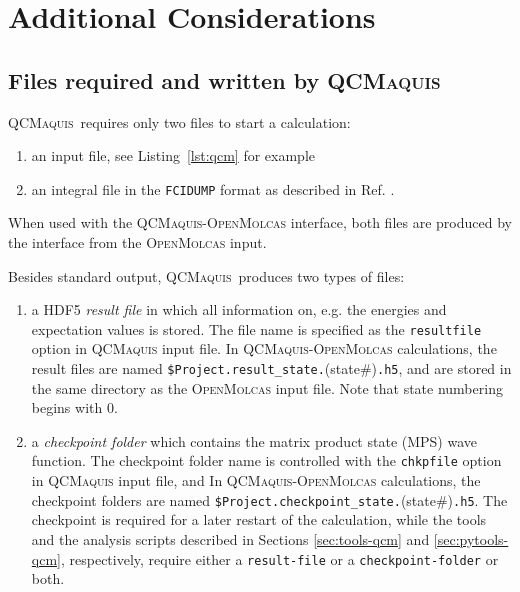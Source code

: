 \documentclass[bibliography=totoc,12pt,a4paper]{scrartcl}
\newcommand{\mol}{\textsc{OpenMolcas}}
\newcommand{\qcm}{\textsc{QCMaquis}}
\newcommand{\kwd}[1]{\texttt{#1}}
\begin{document}
\clearpage
\newpage
\section{Additional Considerations}


\subsection{Files required and written by \qcm}\label{sec:file-req-qcm}

\qcm\ requires only two files to start a calculation:
\begin{enumerate}
 \item an input file, see Listing~\ref{lst:qcm} for example
 \item an integral file in the \texttt{FCIDUMP} format as described in Ref. .
\end{enumerate}

When used with the \qcm{}-\mol{} interface, both files are produced by the interface from the \mol{} input.

Besides standard output, \qcm\ produces two types of files:
\begin{enumerate}
 \item a HDF5 \emph{result file} in which all information on, e.g. the energies and expectation values is stored. The file name is specified as the \kwd{resultfile} option in \qcm{} input file. In \qcm{}-\mol{} calculations, the result files are named \texttt{\$Project.result\_state.}(state\#)\texttt{.h5}, and are stored in the same directory as the \mol{} input file. Note that state numbering begins with 0.
 \item a \emph{checkpoint folder} which contains the matrix product state (MPS) wave function. The checkpoint folder name is controlled with the \kwd{chkpfile} option in \qcm{} input file, and In \qcm{}-\mol{} calculations, the checkpoint folders are named \texttt{\$Project.checkpoint\_state.}(state\#)\texttt{.h5}. The checkpoint is required for a later restart of the calculation, while the tools and the analysis scripts
described in Sections \ref{sec:tools-qcm} and \ref{sec:pytools-qcm}, respectively, require either a \texttt{result-file} or a
\texttt{checkpoint-folder} or both.
\end{enumerate}
\end{document}
